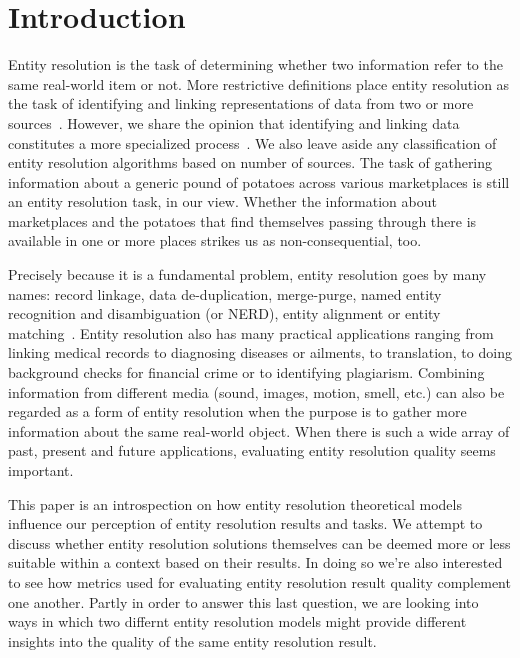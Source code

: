 \documentclass[journal]{IEEEtran}
\begin{document}
    \section{Introduction}\label{sec:introduction}
    Entity resolution is the task of determining whether two information refer
    to the same real-world item or not.
    More restrictive definitions place entity resolution as the task of
    identifying and linking representations of data from two or more
    sources~\cite{Qia17}.
    However, we share the opinion that identifying and linking data constitutes
    a more specialized process~\cite{Tal11}.
    We also leave aside any classification of entity resolution algorithms based
    on number of sources.
    The task of gathering information about a generic pound of potatoes across
    various marketplaces is still an entity resolution task, in our view.
    Whether the information about marketplaces and the potatoes that find
    themselves passing through there is available in one or more places strikes
    us as non-consequential, too.
    
    Precisely because it is a fundamental problem, entity resolution goes by
    many names: record linkage, data de-duplication, merge-purge, named entity
    recognition and disambiguation (or NERD), entity alignment or entity
    matching~\cite{Tal11,fever2009,alhelbawy2014}.
    Entity resolution also has many practical applications ranging from linking
    medical records to diagnosing diseases or ailments, to translation, to doing
    background checks for financial crime or to identifying plagiarism.
    Combining information from different media (sound, images, motion, smell,
    etc.) can also be regarded as a form of entity resolution when the purpose
    is to gather more information about the same real-world object.
    When there is such a wide array of past, present and future applications,
    evaluating entity resolution quality seems important.

    This paper is an introspection on how entity resolution theoretical models
    influence our perception of entity resolution results and tasks.
    We attempt to discuss whether entity resolution solutions themselves can be
    deemed more or less suitable within a context based on their results.
    In doing so we're also interested to see how metrics used for evaluating
    entity resolution result quality complement one another.
    Partly in order to answer this last question, we are looking into ways in
    which two differnt entity resolution models might provide different insights
    into the quality of the same entity resolution result.
    
\end{document}
